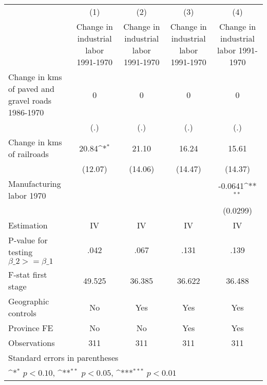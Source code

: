 {
\def\sym#1{\ifmmode^{#1}\else\(^{#1}\)\fi}
\begin{tabular}{l*{4}{c}}
\hline\hline
                    &\multicolumn{1}{c}{(1)}&\multicolumn{1}{c}{(2)}&\multicolumn{1}{c}{(3)}&\multicolumn{1}{c}{(4)}\\
                    &\multicolumn{1}{c}{Change in industrial labor 1991-1970}&\multicolumn{1}{c}{Change in industrial labor 1991-1970}&\multicolumn{1}{c}{Change in industrial labor 1991-1970}&\multicolumn{1}{c}{Change in industrial labor 1991-1970}\\
\hline
Change in kms of paved and gravel roads 1986-1970&           0         &           0         &           0         &           0         \\
                    &         (.)         &         (.)         &         (.)         &         (.)         \\
[1em]
Change in kms of railroads&       20.84\sym{*}  &       21.10         &       16.24         &       15.61         \\
                    &     (12.07)         &     (14.06)         &     (14.47)         &     (14.37)         \\
[1em]
Manufacturing labor 1970&                     &                     &                     &     -0.0641\sym{**} \\
                    &                     &                     &                     &    (0.0299)         \\
\hline
Estimation          &          IV         &          IV         &          IV         &          IV         \\
P-value for testing $\beta\_2 >= \beta\_1$&        .042         &        .067         &        .131         &        .139         \\
F-stat first stage  &      49.525         &      36.385         &      36.622         &      36.488         \\
Geographic controls &          No         &         Yes         &         Yes         &         Yes         \\
Province FE         &          No         &          No         &         Yes         &         Yes         \\
Observations        &         311         &         311         &         311         &         311         \\
\hline\hline
\multicolumn{5}{l}{\footnotesize Standard errors in parentheses}\\
\multicolumn{5}{l}{\footnotesize \sym{*} \(p<0.10\), \sym{**} \(p<0.05\), \sym{***} \(p<0.01\)}\\
\end{tabular}
}
